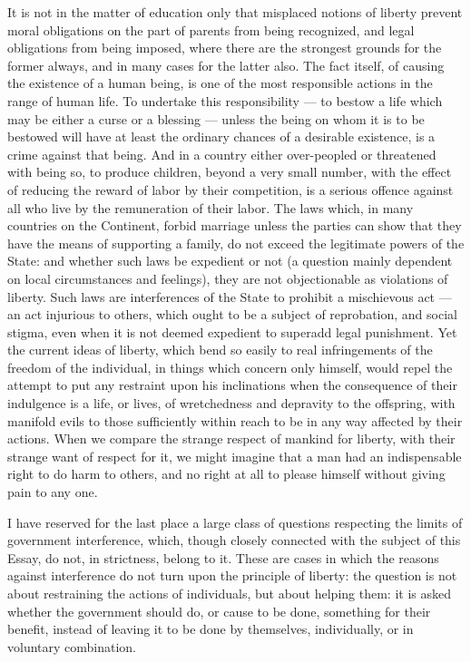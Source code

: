\documentclass[12pt]{report}
\begin{document}
It is not in the matter of education only that misplaced notions of liberty prevent moral obligations on the part of parents from being recognized, and legal obligations from being imposed, where there are the strongest grounds for the former always, and in many cases for the latter also. The fact itself, of causing the existence of a human being, is one of the most responsible actions in the range of human life. To undertake this responsibility — to bestow a life which may be either a curse or a blessing — unless the being on whom it is to be bestowed will have at least the ordinary chances of a desirable existence, is a crime against that being. And in a country either over-peopled or threatened with being so, to produce children, beyond a very small number, with the effect of reducing the reward of labor by their competition, is a serious offence against all who live by the remuneration of their labor. The laws which, in many countries on the Continent, forbid marriage unless the parties can show that they have the means of supporting a family, do not exceed the legitimate powers of the State: and whether such laws be expedient or not (a question mainly dependent on local circumstances and feelings), they are not objectionable as violations of liberty. Such laws are interferences of the State to prohibit a mischievous act — an act injurious to others, which ought to be a subject of reprobation, and social stigma, even when it is not deemed expedient to superadd legal punishment. Yet the current ideas of liberty, which bend so easily to real infringements of the freedom of the individual, in things which concern only himself, would repel the attempt to put any restraint upon his inclinations when the consequence of their indulgence is a life, or lives, of wretchedness and depravity to the offspring, with manifold evils to those sufficiently within reach to be in any way affected by their actions. When we compare the strange respect of mankind for liberty, with their strange want of respect for it, we might imagine that a man had an indispensable right to do harm to others, and no right at all to please himself without giving pain to any one.

I have reserved for the last place a large class of questions respecting the limits of government interference, which, though closely connected with the subject of this Essay, do not, in strictness, belong to it. These are cases in which the reasons against interference do not turn upon the principle of liberty: the question is not about restraining the actions of individuals, but about helping them: it is asked whether the government should do, or cause to be done, something for their benefit, instead of leaving it to be done by themselves, individually, or in voluntary combination.
\end{document}
